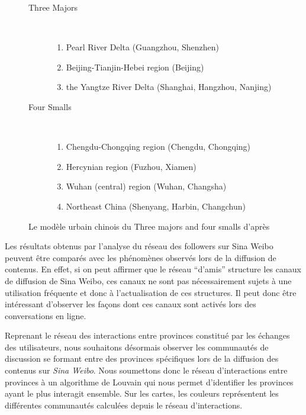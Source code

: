 \begin{figure}[h!]
    \centering
    
    \begin{description}
    \item[Three Majors]
        \hfill \\
      \begin{enumerate}
      \item Pearl River Delta (Guangzhou, Shenzhen)
      \item Beijing-Tianjin-Hebei region (Beijing)
      \item the Yangtze River Delta (Shanghai, Hangzhou, Nanjing)
      \end{enumerate}

    \item[Four Smalls]
    \hfill \\
      \begin{enumerate}
      \item Chengdu-Chongqing region (Chengdu, Chongqing)
      \item Hercynian region (Fuzhou, Xiamen)
      \item Wuhan (central) region (Wuhan, Changsha)
      \item Northeast China (Shenyang, Harbin, Changchun)
      \end{enumerate}

    \end{description}

   \caption{
      Le modèle urbain chinois du Three majors and four smalls d{\textquoteright}après \cite{Zhen2013}
    }
\end{figure}

Les résultats obtenus par l'analyse du réseau des followers sur Sina Weibo peuvent être comparés avec les phénomènes observés lors de la diffusion de contenus. En effet, si on peut affirmer que le réseau {\textquotedblleft}d{\textquoteright}amis{\textquotedblright} structure les canaux de diffusion de Sina Weibo, ces canaux ne sont pas nécessairement sujets \`a une utilisation fréquente et donc \`a l{\textquoteright}actualisation de ces structures. Il peut donc être intéressant d'observer les façons dont ces canaux sont activés lors des conversations en ligne.

Reprenant le réseau des interactions entre provinces constitué par les échanges des utilisateurs, nous souhaitons désormais observer les communautés de discussion se formant entre des provinces spécifiques lors de la diffusion des contenus sur \textit{Sina Weibo}. Nous soumettons donc le réseau d{\textquoteright}interactions entre provinces \`a un algorithme de Louvain \citep{Blondel2008} qui nous permet d'identifier les provinces ayant le plus interagit ensemble. Sur les cartes, les couleurs représentent les différentes communautés calculées depuis le réseau d{\textquoteright}interactions. 

